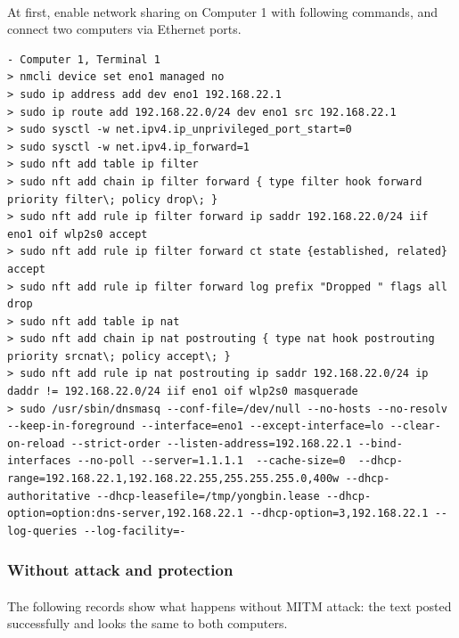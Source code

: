 \documentclass[mscthesis]{usiinfthesis}
\begin{document}
\paragraph{}
At first, enable network sharing on Computer 1 with following commands, and connect two computers via Ethernet ports.
\begin{lstlisting}[language={},frame=single,breaklines=true,postbreak=\mbox{\textcolor{red}{$\hookrightarrow$}\space}]
- Computer 1, Terminal 1
> nmcli device set eno1 managed no
> sudo ip address add dev eno1 192.168.22.1
> sudo ip route add 192.168.22.0/24 dev eno1 src 192.168.22.1
> sudo sysctl -w net.ipv4.ip_unprivileged_port_start=0
> sudo sysctl -w net.ipv4.ip_forward=1
> sudo nft add table ip filter
> sudo nft add chain ip filter forward { type filter hook forward priority filter\; policy drop\; }
> sudo nft add rule ip filter forward ip saddr 192.168.22.0/24 iif eno1 oif wlp2s0 accept
> sudo nft add rule ip filter forward ct state {established, related} accept
> sudo nft add rule ip filter forward log prefix "Dropped " flags all drop
> sudo nft add table ip nat
> sudo nft add chain ip nat postrouting { type nat hook postrouting priority srcnat\; policy accept\; }
> sudo nft add rule ip nat postrouting ip saddr 192.168.22.0/24 ip daddr != 192.168.22.0/24 iif eno1 oif wlp2s0 masquerade
> sudo /usr/sbin/dnsmasq --conf-file=/dev/null --no-hosts --no-resolv --keep-in-foreground --interface=eno1 --except-interface=lo --clear-on-reload --strict-order --listen-address=192.168.22.1 --bind-interfaces --no-poll --server=1.1.1.1  --cache-size=0  --dhcp-range=192.168.22.1,192.168.22.255,255.255.255.0,400w --dhcp-authoritative --dhcp-leasefile=/tmp/yongbin.lease --dhcp-option=option:dns-server,192.168.22.1 --dhcp-option=3,192.168.22.1 --log-queries --log-facility=-
\end{lstlisting}

\subsubsection{Without attack and protection}
\paragraph{}
The following records show what happens without MITM attack: the text posted successfully and looks the same to both computers.
\end{document}
